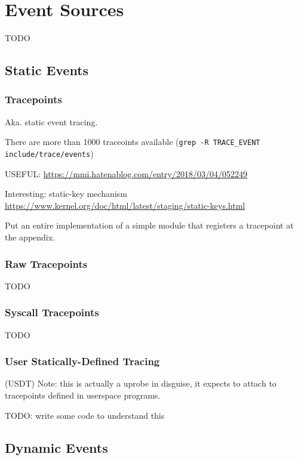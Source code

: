 \section{Event Sources}

TODO

\subsection{Static Events}

\subsubsection*{Tracepoints}



Aka. static event tracing.

There are more than 1000 traceoints available (\verb|grep -R TRACE_EVENT include/trace/events|)

USEFUL: \url{https://mmi.hatenablog.com/entry/2018/03/04/052249}

Interesting: static-key mechanism
\url{https://www.kernel.org/doc/html/latest/staging/static-keys.html}

Put an entire implementation of a simple module that registers a
tracepoint at the appendix.

\subsubsection*{Raw Tracepoints}

TODO

\subsubsection*{Syscall Tracepoints}

TODO

\subsubsection*{User Statically-Defined Tracing}

(USDT)
Note: this is actually a uprobe in disguise, it expects to attach to
tracepoints defined in userspace programs.

TODO: write some code to understand this

\subsection{Dynamic Events}

